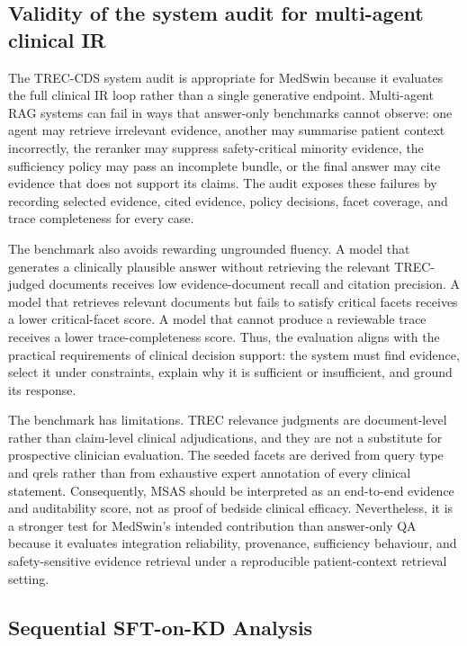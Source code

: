\documentclass[conference]{IEEEtran}
\begin{document}
\subsection{Validity of the system audit for multi-agent clinical IR}
The TREC-CDS system audit is appropriate for MedSwin because it evaluates the full clinical IR loop rather than a single generative endpoint. Multi-agent RAG systems can fail in ways that answer-only benchmarks cannot observe: one agent may retrieve irrelevant evidence, another may summarise patient context incorrectly, the reranker may suppress safety-critical minority evidence, the sufficiency policy may pass an incomplete bundle, or the final answer may cite evidence that does not support its claims. The audit exposes these failures by recording selected evidence, cited evidence, policy decisions, facet coverage, and trace completeness for every case.

The benchmark also avoids rewarding ungrounded fluency. A model that generates a clinically plausible answer without retrieving the relevant TREC-judged documents receives low evidence-document recall and citation precision. A model that retrieves relevant documents but fails to satisfy critical facets receives a lower critical-facet score. A model that cannot produce a reviewable trace receives a lower trace-completeness score. Thus, the evaluation aligns with the practical requirements of clinical decision support: the system must find evidence, select it under constraints, explain why it is sufficient or insufficient, and ground its response.

The benchmark has limitations. TREC relevance judgments are document-level rather than claim-level clinical adjudications, and they are not a substitute for prospective clinician evaluation. The seeded facets are derived from query type and qrels rather than from exhaustive expert annotation of every clinical statement. Consequently, MSAS should be interpreted as an end-to-end evidence and auditability score, not as proof of bedside clinical efficacy. Nevertheless, it is a stronger test for MedSwin's intended contribution than answer-only QA because it evaluates integration reliability, provenance, sufficiency behaviour, and safety-sensitive evidence retrieval under a reproducible patient-context retrieval setting.


\subsection{Sequential SFT-on-KD Analysis}
\label{app:sequential-sft-kd}
\end{document}
